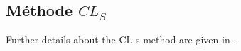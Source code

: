 \subsection{Méthode $CL_S$}\label{chapter-HTT_analysis-section-signal_extraction-CLS}



Further details about the CL s method are given in \cite{CMS-NOTE-2011-005}.